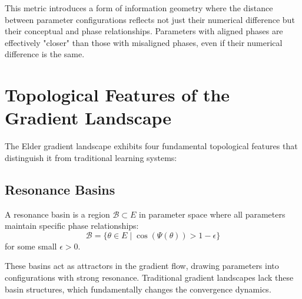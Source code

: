 This metric introduces a form of information geometry where the distance between parameter configurations reflects not just their numerical difference but their conceptual and phase relationships. Parameters with aligned phases are effectively "closer" than those with misaligned phases, even if their numerical difference is the same.

\section{Topological Features of the Gradient Landscape}

The Elder gradient landscape exhibits four fundamental topological features that distinguish it from traditional learning systems:

\subsection{Resonance Basins}

\begin{definition}
A resonance basin is a region $\mathcal{B} \subset E$ in parameter space where all parameters maintain specific phase relationships:
\begin{equation}
\mathcal{B} = \{\theta \in E \mid \cos(\Psi(\theta)) > 1 - \epsilon\}
\end{equation}
for some small $\epsilon > 0$.
\end{definition}

These basins act as attractors in the gradient flow, drawing parameters into configurations with strong resonance. Traditional gradient landscapes lack these basin structures, which fundamentally changes the convergence dynamics.

